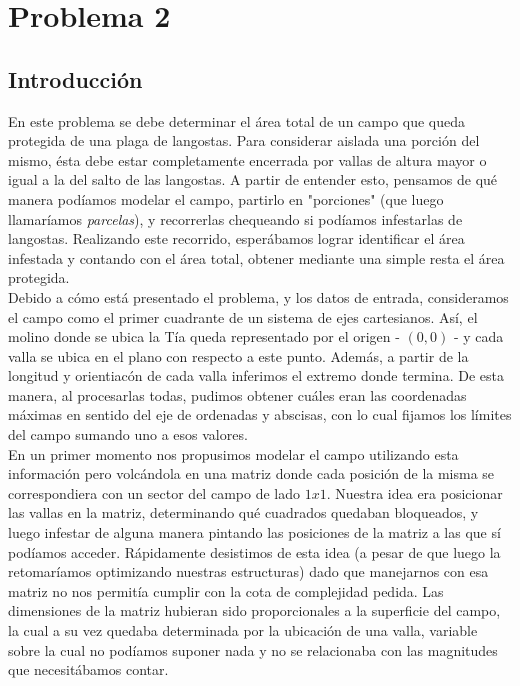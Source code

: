 \section{Problema 2}

\subsection{Introducción}

En este problema se debe determinar el área total de un campo que queda protegida de una plaga de langostas. Para considerar aislada una porción del mismo, ésta debe estar completamente encerrada por vallas de altura mayor o igual a la del salto de las langostas. A partir de entender esto, pensamos de qué manera podíamos modelar el campo, partirlo en "porciones" (que luego llamaríamos \textit{parcelas}), y recorrerlas chequeando si podíamos infestarlas de langostas. Realizando este recorrido, esperábamos lograr identificar el área infestada y contando con el área total, obtener mediante una simple resta el área protegida.\\
\indent Debido a cómo está presentado el problema, y los datos de entrada, consideramos el campo como el primer cuadrante de un sistema de ejes cartesianos. Así, el molino donde se ubica la Tía queda representado por el origen - $(0,0)$ - y cada valla se ubica en el plano con respecto a este punto. Además, a partir de la longitud y orientiacón de cada valla inferimos el extremo donde termina. De esta manera, al procesarlas todas, pudimos obtener cuáles eran las coordenadas máximas en sentido del eje de ordenadas y abscisas, con lo cual fijamos los límites del campo sumando uno a esos valores.\\
\indent En un primer momento nos propusimos modelar el campo utilizando esta información pero volcándola en una matriz donde cada posición de la misma se correspondiera con un sector del campo de lado $1x1$. Nuestra idea era posicionar las vallas en la matriz, determinando qué cuadrados quedaban bloqueados, y luego infestar de alguna manera pintando las posiciones de la matriz a las que sí podíamos acceder. Rápidamente desistimos de esta idea (a pesar de que luego la retomaríamos optimizando nuestras estructuras) dado que manejarnos con esa matriz no nos permitía cumplir con la cota de complejidad pedida. Las dimensiones de la matriz hubieran sido proporcionales a la superficie del campo, la cual a su vez quedaba determinada por la ubicación de una valla, variable sobre la cual no podíamos suponer nada y no se relacionaba con las magnitudes que necesitábamos contar.\\
